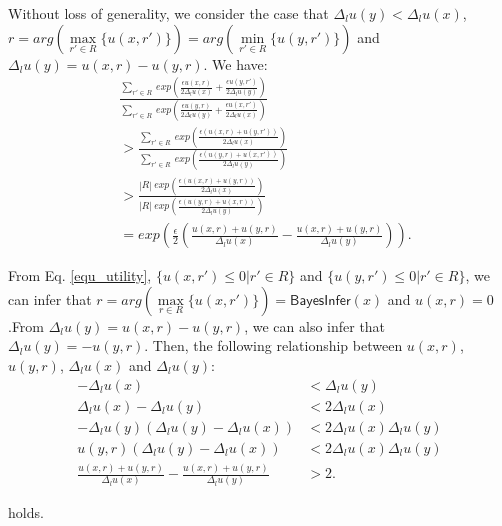 \documentclass{article}
\begin{document}
Without loss of generality, we consider the case that $\Delta_{l}u(y) < \Delta_{l}u(x)$, $r = arg(\max\limits_{r' \in R}\{u(x,r')\}) = arg(\min\limits_{r' \in R}\{u(y,r')\})$ and $\Delta_{l}u(y) = u(x,r) - u(y,r)$. We have:
\begin{equation*}
\begin{split}
& \frac
{\sum\limits_{r' \in R}\ exp(\frac{\epsilon u(x,r)}{2 \Delta_{l}u(x)} 
+ \frac{\epsilon u(y,r')}{2 \Delta_{l}u(y)})}
{\sum\limits_{r' \in R}\ exp(\frac{\epsilon u(y,r)}{2 \Delta_{l}u(y)} 
+ \frac{\epsilon u(x,r')}{2 \Delta_{l}u(x)})}\\
& > \frac
{\sum\limits_{r' \in R}\ exp(\frac{\epsilon (u(x,r) + u(y,r'))}{2 \Delta_{l}u(x)})}
{\sum\limits_{r' \in R}\ exp(\frac{\epsilon (u(y,r) + u(x,r'))}{2 \Delta_{l}u(y)})}\\
& > \frac
{|R|\ exp(\frac{\epsilon (u(x,r) + u(y,r))}{2 \Delta_{l}u(x)})}
{|R|\ exp(\frac{\epsilon (u(y,r) + u(x,r))}{2 \Delta_{l}u(y)})}\\
& = exp(\frac{\epsilon}{2} (\frac{u(x,r) + u(y,r)}{\Delta_{l}u(x)} - \frac{u(x,r) + u(y,r)}{\Delta_{l}u(y)})).
\end{split}
\end{equation*}

From Eq. \ref{equ_utility}, $\{u(x,r') \leq 0|r' \in R\}$ and $\{u(y,r') \leq 0|r' \in R\}$, we can infer that $r = arg(\max\limits_{r \in R}\{u(x,r')\}) = \mathsf{BayesInfer}(x)$ and $u(x,r) = 0$.From $\Delta_{l}u(y) = u(x,r) - u(y,r)$, we can also infer that $\Delta_{l}u(y) = - u(y,r)$. Then, the following relationship between $u(x,r)$, $u(y,r)$, $\Delta_{l}u(x)$ and $\Delta_{l}u(y)$:
\begin{equation*}
\begin{split}
- \Delta_{l}u(x) & < \Delta_{l}u(y) \\
\Delta_{l}u(x) - \Delta_{l}u(y) & < 2 \Delta_{l}u(x) \\
- \Delta_{l}u(y) (\Delta_{l}u(y) - \Delta_{l}u(x)) 
& < 2 \Delta_{l}u(x) \Delta_{l}u(y) \\
u(y,r) (\Delta_{l}u(y) - \Delta_{l}u(x)) 
& < 2 \Delta_{l}u(x) \Delta_{l}u(y) \\
\frac{u(x,r) + u(y,r)}{\Delta_{l}u(x)} - \frac{u(x,r) + u(y,r)}{\Delta_{l}u(y)} & > 2.
\end{split}
\end{equation*}

holds.
 
\end{document}

